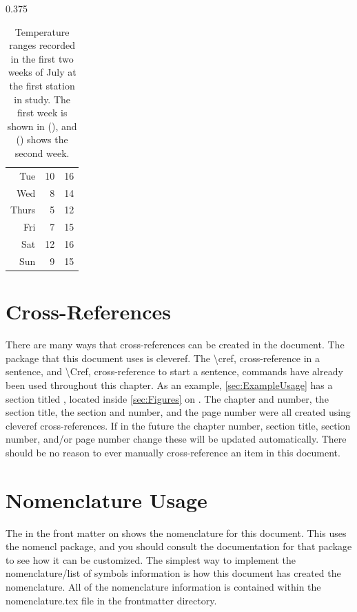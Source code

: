 \begin{table}
\begin{subtable}[t]{0.375\textwidth}
\begin{tabular}{r r r}
                Tue   & 10 & 16 \\
                Wed   & 8  & 14 \\
                Thurs & 5  & 12 \\
                Fri   & 7  & 15 \\
                Sat   & 12 & 16 \\
                Sun   & 9  & 15 \\
                \hline
            \end{tabular}
        \end{subtable}
        \caption{Temperature ranges recorded in the first two weeks of July at the first station in study. The first week is shown in (), and () shows the second week.}
        \label{tab:temps}
    \end{table}

\section{Cross-References} \label{sec:CrossReferences}
    There are many ways that cross-references can be created in the document.
    The package that this document uses is cleveref.
    The \textbackslash cref, cross-reference in a sentence, and \textbackslash Cref, cross-reference to start a sentence, commands have already been used throughout this chapter.
    As an example, \cref{sec:ExampleUsage} has a section titled , located inside \cref{sec:Figures} on .
    The chapter and number, the section title, the section and number, and the page number were all created using cleveref cross-references.
    If in the future the chapter number, section title, section number, and/or page number change these will be updated automatically.
    There should be no reason to ever manually cross-reference an item in this document.

\section{Nomenclature Usage} \label{sec:NomenclatureUsage}
    The  in the front matter on  shows the nomenclature for this document.
    This uses the nomencl package, and you should consult the documentation for that package to see how it can be customized.
    The simplest way to implement the nomenclature/list of symbols information is how this document has created the nomenclature.
    All of the nomenclature information is contained within the nomenclature.tex file in the frontmatter directory.

